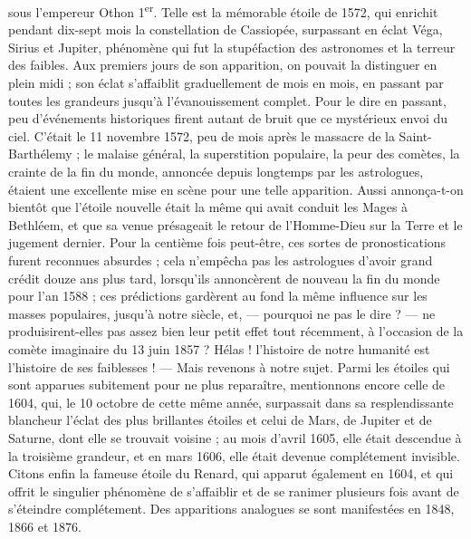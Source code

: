 \documentclass[a4paper, 11pt, oneside]{article}
\begin{document}
sous l'empereur Othon 1\textsuperscript{er}. Telle est la mémorable étoile de 1572, qui enrichit pendant dix-sept mois la constellation de Cassiopée, surpassant en éclat Véga, Sirius et Jupiter, phénomène qui fut la stupéfaction des astronomes et la terreur des faibles. Aux premiers jours de son apparition, on pouvait la distinguer en plein midi ; son éclat s'affaiblit graduellement de mois en mois, en passant par toutes les grandeurs jusqu'à l'évanouissement complet. Pour le dire en passant, peu d'événements historiques firent autant de bruit que ce mystérieux envoi du ciel. C'était le 11 novembre 1572, peu de mois après le massacre de la Saint-Barthélemy ; le malaise général, la superstition populaire, la peur des comètes, la crainte de la fin du monde, annoncée depuis longtemps par les astrologues, étaient une excellente mise en scène pour une telle apparition. Aussi annonça-t-on bientôt que l'étoile nouvelle était la même qui avait conduit les Mages à Bethléem, et que sa venue présageait le retour de l'Homme-Dieu sur la Terre et le jugement dernier. Pour la centième fois peut-être, ces sortes de pronostications furent reconnues absurdes ; cela n'empêcha pas les astrologues d'avoir grand crédit douze ans plus tard, lorsqu'ils annoncèrent de nouveau la fin du monde pour l'an 1588 ; ces prédictions gardèrent au fond la même influence sur les masses populaires, jusqu'à notre siècle, et, --- pourquoi ne pas le dire ? --- ne produisirent-elles pas assez bien leur petit effet tout récemment, à l'occasion de la comète imaginaire du 13 juin 1857 ? Hélas ! l'histoire de notre humanité est l'histoire de ses faiblesses ! --- Mais revenons à notre sujet. Parmi les étoiles qui sont apparues subitement pour ne plus reparaître, mentionnons encore celle de 1604, qui, le 10 octobre de cette même année, surpassait dans sa resplendissante blancheur l'éclat des plus brillantes étoiles et celui de Mars, de Jupiter et de Saturne, dont elle se trouvait voisine ; au mois d'avril 1605, elle était descendue à la troisième grandeur, et en mars 1606, elle était devenue complétement invisible. Citons enfin la fameuse étoile du Renard, qui apparut également en 1604, et qui offrit le singulier phénomène de s'affaiblir et de se ranimer plusieurs fois avant de s'éteindre complétement. Des apparitions analogues se sont manifestées en 1848, 1866 et 1876.
\end{document}
